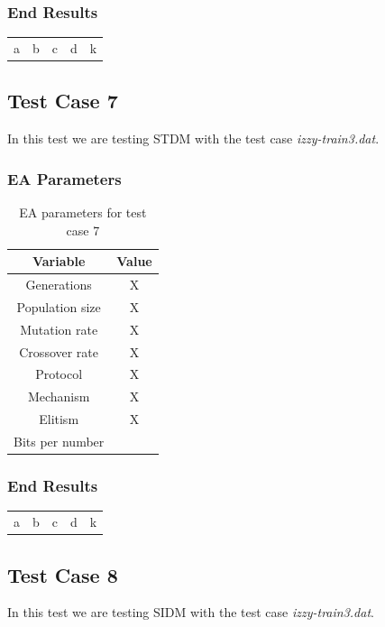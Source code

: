 \subsubsection{End Results}\label{sec:test-case-6-results}
\begin{table}
	\begin{tabular}{c c c c c}
		a & b & c & d & k \\
	\end{tabular}
\end{table}

\subsection{Test Case 7}\label{sec:test-case-7}
In this test we are testing STDM with the test case
\textit{izzy-train3.dat}.
\subsubsection{EA Parameters}\label{sec:test-case-7-parameters}
\begin{table}
	\begin{tabular}{c c}
		Variable & Value \\
		\hline
		Generations & X \\
		\hline
		Population size & X \\
		\hline
		Mutation rate & X \\
		\hline
		Crossover rate & X \\
		\hline
		Protocol & X \\
		\hline
		Mechanism & X \\
		\hline
		Elitism & X \\
		\hline
		Bits per number & \\
	\end{tabular}
	\caption{EA parameters for test case 7}
\end{table}
\subsubsection{End Results}\label{sec:test-case-7-results}
\begin{table}
	\begin{tabular}{c c c c c}
		a & b & c & d & k \\
	\end{tabular}
\end{table}

\subsection{Test Case 8}\label{sec:test-case-8}
In this test we are testing SIDM with the test case
\textit{izzy-train3.dat}.
